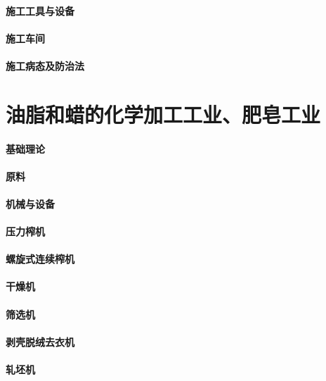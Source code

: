 \documentclass[UTF8]{../../ApplicationUniverse}
\begin{document}
    \subsubsection{施工工具与设备}
    \subsubsection{施工车间}
    \subsubsection{施工病态及防治法}







\chapter{油脂和蜡的化学加工工业、肥皂工业}
\subsubsection{基础理论}
\subsubsection{原料}
\subsubsection{机械与设备}
    \subsubsection{压力榨机}
    \subsubsection{螺旋式连续榨机}
    \subsubsection{干燥机}
    \subsubsection{筛选机}
    \subsubsection{剥壳脱绒去衣机}
    \subsubsection{轧坯机}
\end{document}

